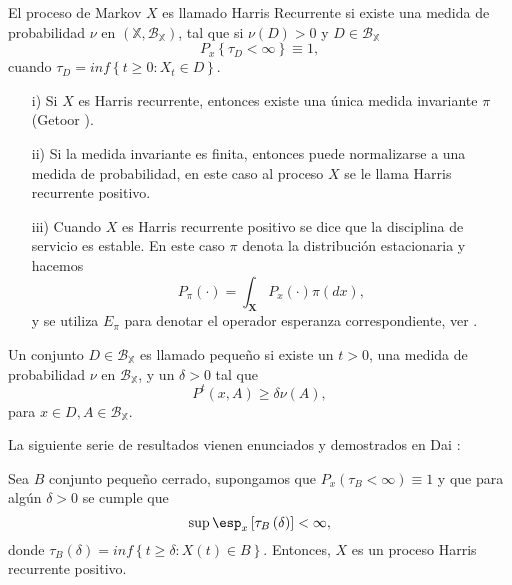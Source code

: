 \begin{Def}
El proceso de Markov $X$ es llamado Harris Recurrente si existe
una medida de probabilidad $\nu$ en
$\left(\mathbb{X},\mathcal{B}_{\mathbb{X}}\right)$, tal que si
$\nu\left(D\right)>0$ y $D\in\mathcal{B}_{\mathbb{X}}$
\[P_{x}\left\{\tau_{D}<\infty\right\}\equiv1,\] cuando
$\tau_{D}=inf\left\{t\geq0:X_{t}\in D\right\}$.
\end{Def}

\begin{Note}
\begin{itemize}
\item[i)] Si $X$ es Harris recurrente, entonces existe una \'unica
medida invariante $\pi$ (Getoor \cite{Getoor}).

\item[ii)] Si la medida invariante es finita, entonces puede
normalizarse a una medida de probabilidad, en este caso al proceso
$X$ se le llama Harris recurrente positivo.


\item[iii)] Cuando $X$ es Harris recurrente positivo se dice que
la disciplina de servicio es estable. En este caso $\pi$ denota la
distribuci\'on estacionaria y hacemos
\[P_{\pi}\left(\cdot\right)=\int_{\mathbf{X}}P_{x}\left(\cdot\right)\pi\left(dx\right),\]
y se utiliza $E_{\pi}$ para denotar el operador esperanza
correspondiente, ver \cite{DaiSean}.
\end{itemize}
\end{Note}

\begin{Def}\label{Def.Cto.Peq.}
Un conjunto $D\in\mathcal{B_{\mathbb{X}}}$ es llamado peque\~no si
existe un $t>0$, una medida de probabilidad $\nu$ en
$\mathcal{B_{\mathbb{X}}}$, y un $\delta>0$ tal que
\[P^{t}\left(x,A\right)\geq\delta\nu\left(A\right),\] para $x\in
D,A\in\mathcal{B_{\mathbb{X}}}$.
\end{Def}

La siguiente serie de resultados vienen enunciados y demostrados
en Dai \cite{Dai}:
\begin{Lema}
Sea $B$ conjunto peque\~no cerrado, supongamos que
$P_{x}\left(\tau_{B}<\infty\right)\equiv1$ y que para alg\'un
$\delta>0$ se cumple que
\begin{equation}\label{Eq.3.1}
\sup\esp_{x}\left[\tau_{B}\left(\delta\right)\right]<\infty,
\end{equation}
donde
$\tau_{B}\left(\delta\right)=inf\left\{t\geq\delta:X\left(t\right)\in
B\right\}$. Entonces, $X$ es un proceso Harris recurrente
positivo.
\end{Lema}

